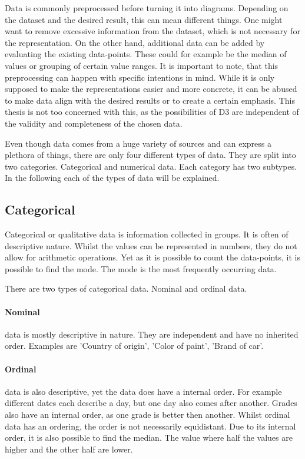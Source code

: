 Data is commonly preprocessed before turning it into diagrams. Depending on the dataset and the desired result, this can mean different things. One might want to remove excessive information from the dataset, which is not necessary for the representation. On the other hand, additional data can be added by evaluating the existing data-points. These could for example be the median of values or grouping of certain value ranges\cite{garcia2015data}. It is important to note, that this preprocessing can happen with specific intentions in mind. While it is only supposed to make the representations easier and more concrete, it can be abused to make data align with the desired results or to create a certain emphasis. This thesis is not too concerned with this, as the possibilities of D3 are independent of the validity and completeness of the chosen data.

Even though data comes from a huge variety of sources and can express a plethora of things, there are only four different types of data\cite{henze_2021}. They are split into two categories. Categorical and numerical data. Each category has two subtypes. In the following each of the types of data will be explained.

\subsection{Categorical}

Categorical or qualitative data is information collected in groups. It is often of descriptive nature. Whilst the values can be represented in numbers, they do not allow for arithmetic operations. Yet as it is possible to count the data-points, it is possible to find the mode. The mode is the most frequently occurring data.

There are two types of categorical data. Nominal and ordinal data.

\paragraph{Nominal}
data is mostly descriptive in nature. They are independent and have no inherited order. Examples are 'Country of origin', 'Color of paint', 'Brand of car'.

\paragraph{Ordinal}
data is also descriptive, yet the data does have a internal order. For example different dates each describe a day, but one day also comes after another. Grades also have an internal order, as one grade is better then another. Whilst ordinal data has an ordering, the order is not necessarily equidistant. Due to its internal order, it is also possible to find the median. The value where half the values are higher and the other half are lower.

